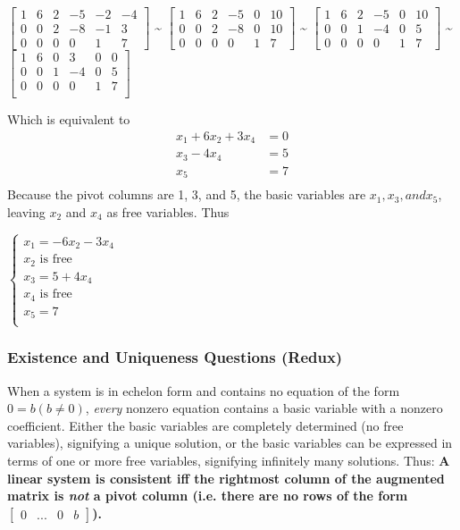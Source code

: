\documentclass[12pt]{article} %
\begin{document}
$\begin{bmatrix}
	1 & 6 & 2 & -5 & -2 & -4\\
	0 & 0 & 2 & -8 & -1 & 3\\
	0 & 0 & 0 & 0 & 1 & 7
\end{bmatrix}$
\textasciitilde 
$\begin{bmatrix}
	1 & 6 & 2 & -5 & 0 & 10\\
	0 & 0 & 2 & -8 & 0 & 10\\
	0 & 0 & 0 & 0 & 1 & 7
\end{bmatrix}$
\textasciitilde 
$\begin{bmatrix}
	1 & 6 & 2 & -5 & 0 & 10\\
	0 & 0 & 1 & -4 & 0 & 5\\
	0 & 0 & 0 & 0 & 1 & 7
\end{bmatrix}$
\textasciitilde
$\begin{bmatrix}
	1 & 6 & 0 & 3 & 0 & 0\\
	0 & 0 & 1 & -4 & 0 & 5\\
	0 & 0 & 0 & 0 & 1 & 7\\
\end{bmatrix}$



Which is equivalent to 
\begin{align*}
	x_1 + 6x_2 + 3x_4 &= 0\\
	x_3 - 4x_4 &= 5 \\
	x_5 &= 7\\
\end{align*}
Because the pivot columns are 1, 3, and 5, the basic variables are $x_1, x_3, and x_5$, leaving $x_2$ and $x_4$ as free variables. Thus
\begin{center}
	$\begin{cases}
		x_1 = -6x_2 - 3x_4\\
		x_2 \text{ is free}\\
		x_3 = 5 + 4x_4\\
		x_4 \text{ is free}\\
		x_5 = 7\\
	\end{cases}$
\end{center}
\subsubsection{Existence and Uniqueness Questions (Redux)}
When a system is in echelon form and contains no equation of the form $0 = b (b \neq 0)$, \emph{every} nonzero equation contains a basic variable with a nonzero coefficient. Either the basic variables are completely determined (no free variables), signifying a unique solution, or the basic variables can be expressed in terms of one or more free variables, signifying infinitely many solutions. Thus:
\textbf{A linear system is consistent iff the rightmost column of the augmented matrix is \emph{not} a pivot column (i.e. there are no rows of the form $\begin{bmatrix} 0 & ... & 0 & b\end{bmatrix}$).}
\end{document}
